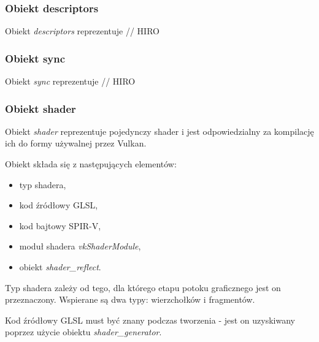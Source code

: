 \subsubsection{Obiekt descriptors}
Obiekt \textit{descriptors} reprezentuje 
// HIRO

\subsubsection{Obiekt sync}
Obiekt \textit{sync} reprezentuje 
// HIRO

\subsubsection{Obiekt shader}
Obiekt \textit{shader} reprezentuje pojedynczy shader i jest odpowiedzialny za kompilację ich do formy używalnej przez Vulkan.

Obiekt składa się z następujących elementów:
\begin{itemize}
	\item typ shadera,
	\item kod źródłowy GLSL,
	\item kod bajtowy SPIR-V,
	\item moduł shadera \textit{vkShaderModule},
	\item obiekt \textit{shader\_reflect}.
\end{itemize}

Typ shadera zależy od tego, dla którego etapu potoku graficznego jest on przeznaczony.
Wspierane są dwa typy: wierzchołków i fragmentów.

Kod źródłowy GLSL must być znany podczas tworzenia - jest on uzyskiwany poprzez użycie obiektu \textit{shader\_generator}.

